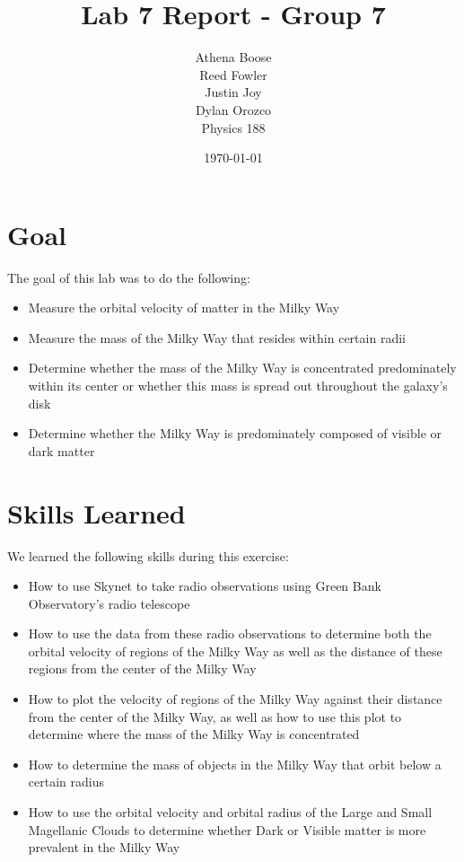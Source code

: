 \documentclass{article}
\author{Athena Boose\\Reed Fowler\\Justin Joy\\Dylan Orozco\bigskip\\Physics 188}
\date{\today}
\title{Lab 7 Report - Group 7}
\begin{document}
\cleanlookdateon
\maketitle

\section{Goal}

\noindent The goal of this lab was to do the following:

\begin{itemize}
    \item Measure the orbital velocity of matter in the Milky Way
    \item Measure the mass of the Milky Way that resides within certain radii
    \item Determine whether the mass of the Milky Way is concentrated predominately within its center or whether this mass is spread out throughout the galaxy's disk
    \item Determine whether the Milky Way is predominately composed of visible or dark matter
\end{itemize}

\section{Skills Learned}

\noindent We learned the following skills during this exercise:

\begin{itemize}
    \item How to use Skynet to take radio observations using Green Bank Observatory's radio telescope
    \item How to use the data from these radio observations to determine both the orbital velocity of regions of the Milky Way as well as the distance of these regions from the center of the Milky Way
    \item How to plot the velocity of regions of the Milky Way against their distance from the center of the Milky Way, as well as how to use this plot to determine where the mass of the Milky Way is concentrated
    \item How to determine the mass of objects in the Milky Way that orbit below a certain radius
    \item How to use the orbital velocity and orbital radius of the Large and Small Magellanic Clouds to determine whether Dark or Visible matter is more prevalent in the Milky Way
\end{itemize}
\end{document}
